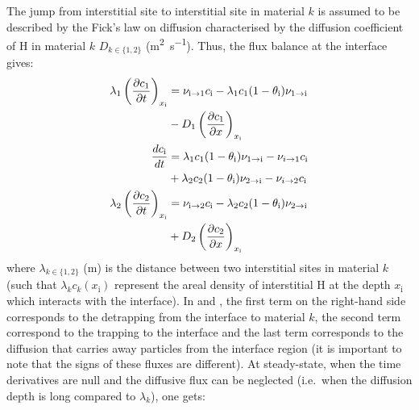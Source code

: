 \indent The jump from interstitial site to interstitial site in material $k$ is assumed to be described by the Fick's law on diffusion characterised by the diffusion coefficient of H in material $k$ $D_{k\in\lbrace 1,2\rbrace}$ (\si{m^{2}.s^{-1}}).
Thus, the flux balance at the interface gives:
\begin{align}
\lambda_1 \left( \frac{\partial c_1}{\partial t} \right)_{x_\mathrm{i}}
                      &= \nu_{\mathrm{i}\rightarrow 1}c_\mathrm{i}
                        -\lambda_1 c_1(1-\theta_\mathrm{i})\nu_{1\rightarrow\mathrm{i}}  \nonumber
                        \\&-D_1\left(\frac{\partial c_1}{\partial x}\right)_{x_\mathrm{i}}
                        \labeq{c1}
                        \\
\frac{d c_\mathrm{i}}{d t} 
                     &= \lambda_1 c_1 (1-\theta_\mathrm{i})\nu_{1\rightarrow\mathrm{i}}
                       - \nu_{i\rightarrow 1}c_\mathrm{i} \nonumber
                       \\ &+\lambda_2 c_2 (1-\theta_\mathrm{i})\nu_{2\rightarrow\mathrm{i}}
                       - \nu_{i\rightarrow 2}c_\mathrm{i}
                       \labeq{ci}
                       \\
\lambda_2 \left( \frac{\partial c_2}{\partial t}\right)_{x_\mathrm{i}}
                    &= \nu_{\mathrm{i}\rightarrow 2}c_\mathrm{i}
                      -\lambda_2 c_2 (1-\theta_\mathrm{i})\nu_{2\rightarrow\mathrm{i}} \nonumber
                      \\ &+D_2 \left(\frac{\partial c_2}{\partial x}\right)_{x_\mathrm{i}}
                      \labeq{c2}
\end{align}
where $\lambda_{k\in\lbrace 1,2 \rbrace}$ (\si{m}) is the distance between two interstitial sites in material $k$ (such that $\lambda_k c_k(x_\mathrm{i})$ represent the areal density of interstitial H at the depth $x_\mathrm{i}$ which interacts with the interface).
In  and , the first term on the right-hand side corresponds to the detrapping from the interface to material $k$, the second term correspond to the trapping to the interface and the last term corresponds to the diffusion that carries away particles from the interface region (it is important to note that the signs of these fluxes are different).
\indent At steady-state, when the time derivatives are null and the diffusive flux can be neglected (i.e.\ when the diffusion depth is long compared to $\lambda_k$), one gets:
